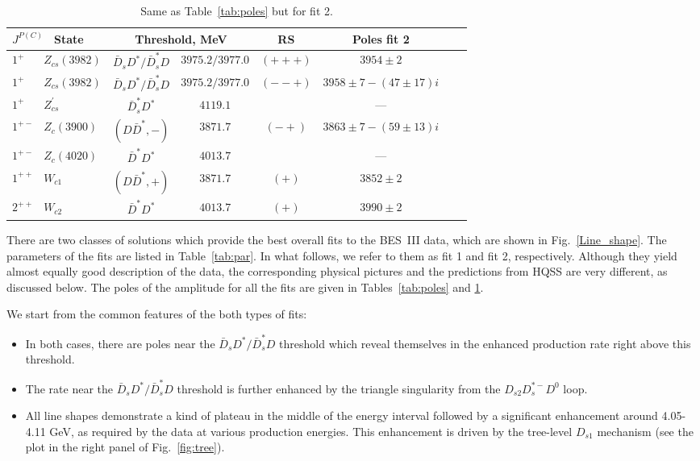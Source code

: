 \documentclass[preprint,12pt,3p]{elsarticle}
\begin{document}
\begin{table}[tb]
\begin{center}
\begin{tabular}{|l |cc | c c | c c| }
\hline 
\hline
$J^{P(C)}$ $\,$ State & \multicolumn{2}{c|}{Threshold, MeV} & RS & Poles fit 2 
\\
\hline 
$1^{+\phantom{-}}$ $\,$ $Z_{cs}(3982)$ & $\bar{D}_s D^*/\bar{D}_s^* D$ & $3975.2/3977.0$ & $(+++)$ & $3954\pm2$ 
\\
\hline 
$1^{+\phantom{-}}$ $\,$ $Z_{cs}(3982)$ & $\bar{D}_s D^*/\bar{D}_s^* D$ & $3975.2/3977.0$ & $(--+)$ & $3958\pm7-(47\pm17) i$ %
\\
\hline
$1^{+\phantom{-}}$ $\,$ $Z_{cs}^{\prime}$ & $\bar{D}_s^*D^*$ & $4119.1$ & & --- 
\\
\hline
\hline
$1^{+-}$ $\,$ $Z_c(3900)$ & $(D\bar D^*,-)$ & $3871.7$ & $(-+)$ & $3863\pm7 -(59\pm13) i$
\\
\hline
$1^{+-}$ $\,$ $Z_c(4020)$ & $\bar{D}^* D^*$ & $4013.7$ & & --- 
\\
\hline
\hline
$1^{++}$ $\,$ $W_{c1}$ & $(D\bar D^*,+)$ & $3871.7$ & $(+)$ & $3852\pm2$
\\
\hline
\hline
 $2^{++}$ $\,$ $W_{c2}$ & $\bar{D}^* D^*$ & $4013.7$ & $(+)$ & $3990\pm2$ 
\\
\hline
\hline
\end{tabular}
\end{center}
\caption{Same as Table~\ref{tab:poles} but for fit 2. }
\label{tab:poles2}
\end{table}

There are two classes of solutions which provide the best overall fits to the BES~III data, which are shown in Fig.~\ref{Line_shape}. The parameters of the fits are listed in Table~\ref{tab:par}. In what follows, we refer to them as fit 1 and fit 2, respectively. Although they yield almost equally good description of the data, the corresponding physical pictures and the predictions from HQSS are very different, as discussed below. 
The poles of the amplitude for all the fits are given in Tables~\ref{tab:poles} and \ref{tab:poles2}.

We start from the common features of the both types of fits: 
\begin{itemize}
\item In both cases, there are poles near the $\bar{D}_s D^*/ \bar{D}_s^* D$ threshold which reveal themselves in the enhanced production rate right above this threshold. 
\item The rate near the $\bar{D}_s D^*/ \bar{D}_s^* D$ threshold is further enhanced by the triangle singularity from the $D_{s2} D_s^{*-} D^0$ loop.
\item All line shapes demonstrate a kind of plateau in the middle of the energy interval followed by a significant enhancement around 4.05-4.11 GeV, as required by the data at various production energies. This enhancement is driven by the tree-level $D_{s1}$ mechanism (see the  plot in the right panel of Fig.~\ref{fig:tree}). 
\end{itemize}
\end{document}
